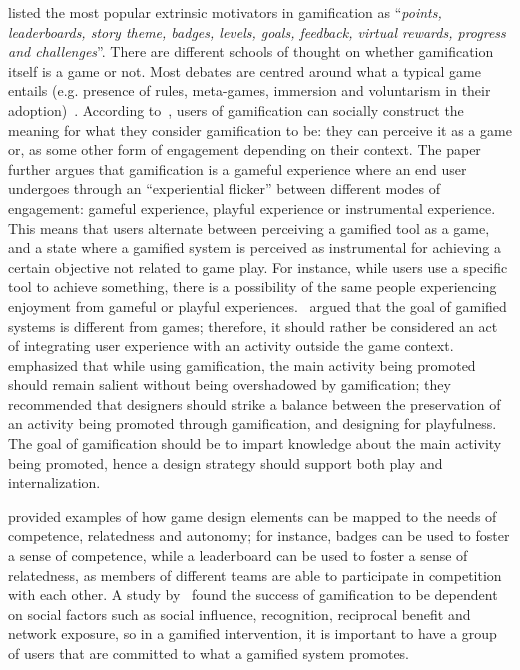\cite{hamari2014does} listed the most popular extrinsic motivators in gamification as ``\emph{points, leaderboards, story theme, badges, levels, goals, feedback, virtual rewards, progress and challenges}''. There are different schools of thought on whether gamification itself is a game or not. Most debates are centred around what a typical game entails (e.g. presence of rules, meta-games, immersion and voluntarism in their adoption)~\citep{seaborn2015:gamification}. According to~\cite{deterding2011game}, users of gamification can socially construct the meaning for what they consider gamification to be: they can perceive it as a game or, as some  other form of engagement depending on their context. The paper further argues that gamification is a gameful experience where an end user undergoes through an ``experiential flicker'' between different modes of engagement: gameful experience, playful experience or instrumental experience. This means that users alternate between perceiving a gamified tool as a game, and a state where a gamified system is perceived as instrumental for achieving a certain objective not related to game play. For instance, while users use a specific tool to achieve something, there is a possibility of the same people experiencing enjoyment from gameful or playful experiences.~\cite{seaborn2015:gamification} argued that the goal of gamified systems is different from games; therefore, it should rather be considered an act of integrating user experience with an activity outside the game context.~\cite{knaving2013designing} emphasized that while using gamification, the main activity being promoted should remain salient without being overshadowed by gamification; they recommended that designers should strike a balance between the preservation of an activity being promoted through gamification, and designing for playfulness. The goal of gamification should be to impart knowledge about the main activity being promoted, hence a design strategy should support both play and internalization.

\cite{sailer2013:psychological} provided examples of how game design elements can be mapped to the needs of competence, relatedness and autonomy; for instance, badges can be used to foster a sense of competence, while a leaderboard can be used to foster a sense of relatedness, as members of different teams are able to participate in competition with each other. A study by~\cite{hamari2013social} found the success of gamification to be dependent on social factors such as social influence, recognition, reciprocal benefit and network exposure, so in a gamified intervention, it is important to have a group of users that are committed to what a gamified system promotes.

